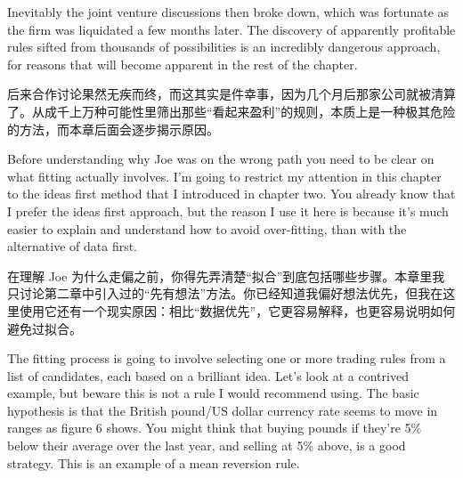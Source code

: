 \bipairgap

\begin{englishblock} Inevitably the joint venture discussions then broke down, which was fortunate as the firm was liquidated a few months later. The discovery of apparently profitable rules sifted from thousands of possibilities is an incredibly dangerous approach, for reasons that will become apparent in the rest of the chapter. \end{englishblock}

\begin{chineseblock}后来合作讨论果然无疾而终，而这其实是件幸事，因为几个月后那家公司就被清算了。从成千上万种可能性里筛出那些“看起来盈利”的规则，本质上是一种极其危险的方法，而本章后面会逐步揭示原因。\end{chineseblock}


\begin{englishblock} Before understanding why Joe was on the wrong path you need to be clear on what fitting actually involves. I'm going to restrict my attention in this chapter to the ideas first method that I introduced in chapter two. You already know that I prefer the ideas first approach, but the reason I use it here is because it's much easier to explain and understand how to avoid over-fitting, than with the alternative of data first. \end{englishblock}

\begin{chineseblock}在理解 Joe 为什么走偏之前，你得先弄清楚“拟合”到底包括哪些步骤。本章里我只讨论第二章中引入过的“先有想法”方法。你已经知道我偏好想法优先，但我在这里使用它还有一个现实原因：相比“数据优先”，它更容易解释，也更容易说明如何避免过拟合。\end{chineseblock}

\bipairgap

\begin{englishblock} The fitting process is going to involve selecting one or more trading rules from a list of candidates, each based on a brilliant idea. Let's look at a contrived example, but beware this is not a rule I would recommend using. The basic hypothesis is that the British pound/US dollar currency rate seems to move in ranges as figure 6 shows. You might think that buying pounds if they're 5\% below their average over the last year, and selling at 5\% above, is a good strategy. This is an example of a mean reversion rule. \end{englishblock}


